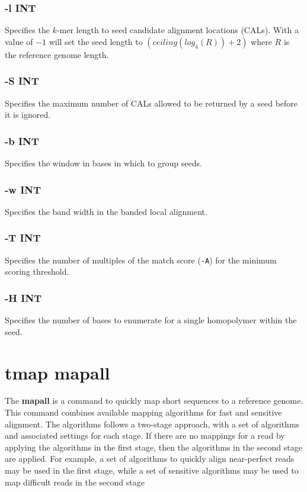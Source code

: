 \documentclass[a4paper,12pt]{book}
\newcommand{\TT}[1]{{\tt #1}} %
\newcommand{\BF}[1]{{\bf #1}} %
\begin{document}
\subsubsection{-l INT}
Specifies the $k$-mer length to seed candidate alignment locations (CALs).
With a value of $-1$ will set the seed length to $\left(ceiling(log_4(R)) + 2\right)$ where $R$ is the reference genome length.

\subsubsection{-S INT}
Specifies the maximum number of CALs allowed to be returned by a seed before it is ignored.

\subsubsection{-b INT}
Specifies the window in bases in which to group seeds.

\subsubsection{-w INT}
Specifies the band width in the banded local alignment.

\subsubsection{-T INT}
Specifies the number of multiples of the match score (\TT{-A}) for the minimum scoring threshold.

\subsubsection{-H INT}
Specifies the number of bases to enumerate for a single homopolymer within the seed.

\section{tmap mapall}
\label{sec:mapall}
The \BF{mapall} is a command to quickly map short sequences to a reference genome.
This command combines available mapping algorithms for fast and sensitive alignment.
The algorithms follows a two-stage approach, with a set of algorithms and associated settings for each stage.
If there are no mappings for a read by applying the algorithms in the first stage, then the algorithms in the second stage are applied. 
For example, a set of algorithms to quickly align near-perfect reads may be used in the first stage, while a set of sensitive algorithms may be used to map difficult reads in the second stage
\end{document}
